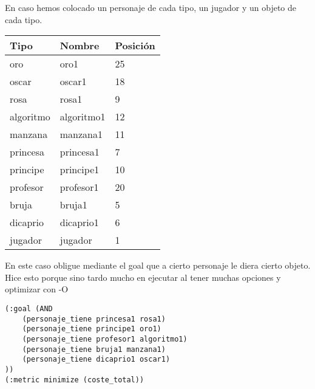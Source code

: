 \documentclass[]{article}
\begin{document}
En caso hemos colocado un personaje de cada tipo, un jugador y un objeto de cada tipo.

\begin{table}[htbp]
	\begin{center}
		\begin{tabular}{|l|l|l|}
			\hline
			Tipo & Nombre & Posición \\
			\hline \hline
			oro & oro1 & 25 \\ \hline
			oscar & oscar1 & 18\\ \hline
			rosa & rosa1 & 9\\ \hline
			algoritmo & algoritmo1 & 12 \\ \hline
			manzana & manzana1 & 11\\ \hline
			princesa & princesa1 & 7 \\ \hline
			principe & principe1 & 10 \\ \hline
			profesor & profesor1 & 20  \\ \hline
			bruja & bruja1 & 5 \\ \hline
			dicaprio  & dicaprio1& 6 \\ \hline
			jugador & jugador & 1 \\ \hline
			
		\end{tabular}
	\end{center}
\end{table}

En este caso obligue mediante el goal que a cierto personaje le diera cierto objeto. Hice esto porque sino tardo mucho en ejecutar al tener muchas opciones y optimizar con -O
\newpage
\begin{lstlisting}
(:goal (AND
	(personaje_tiene princesa1 rosa1)
	(personaje_tiene principe1 oro1)
	(personaje_tiene profesor1 algoritmo1)
	(personaje_tiene bruja1 manzana1)
	(personaje_tiene dicaprio1 oscar1)
))
(:metric minimize (coste_total))
\end{lstlisting}
\end{document}
